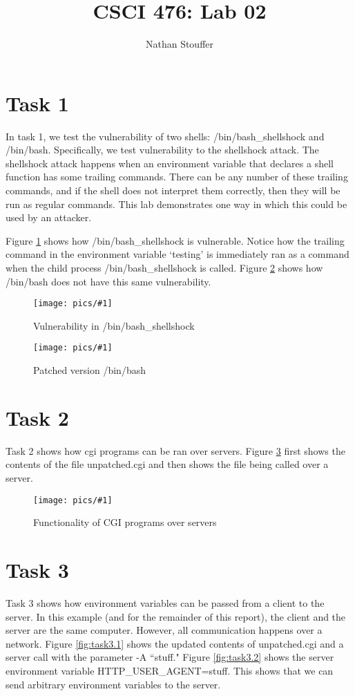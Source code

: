 \documentclass[11pt]{article}
\newcommand{\fig}[2]{ 
\begin{figure}[h]
	\centering
	\caption{#2}
	\texttt{[image: pics/\#1]}
	\label{fig:#1}
\end{figure} 
}
\begin{document}
\title{CSCI 476: Lab 02}
\author{Nathan Stouffer}
\maketitle
\newpage

\section*{Task 1}

In task 1, we test the vulnerability of two shells: /bin/bash\_shellshock and /bin/bash. Specifically, we test vulnerability to the shellshock attack. The shellshock attack happens when an environment variable that declares a shell function has some trailing commands. There can be any number of these trailing commands, and if the shell does not interpret them correctly, then they will be run as regular commands. This lab demonstrates one way in which this could be used by an attacker.

Figure \ref{fig:task1.1} shows how /bin/bash\_shellshock is vulnerable. Notice how the trailing command in the environment variable `testing' is immediately ran as a command when the child process /bin/bash\_shellshock is called. Figure \ref{fig:task1.2} shows how /bin/bash does not have this same vulnerability.

\fig{task1.1}{Vulnerability in /bin/bash\_shellshock}

\fig{task1.2}{Patched version /bin/bash}

\newpage

\section*{Task 2}

Task 2 shows how cgi programs can be ran over servers. Figure \ref{fig:task2} first shows the contents of the file unpatched.cgi and then shows the file being called over a server.

\fig{task2}{Functionality of CGI programs over servers}

\newpage

\section*{Task 3}

Task 3 shows how environment variables can be passed from a client to the server. In this example (and for the remainder of this report), the client and the server are the same computer. However, all communication happens over a network.
Figure \ref{fig:task3.1} shows the updated contents of unpatched.cgi and a server call with the parameter -A ``stuff." Figure \ref{fig:task3.2} shows the server environment variable HTTP\_USER\_AGENT=stuff. This shows that we can send arbitrary environment variables to the server.
\end{document}
